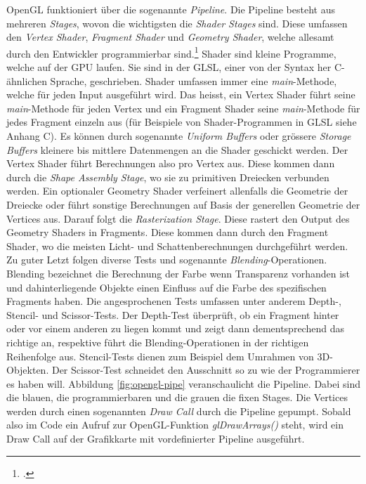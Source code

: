 \documentclass[titlepage, 11pt, a4paper, ngerman]{article}
\begin{document}
\acrshort{OpenGL} funktioniert über die sogenannte \textit{Pipeline}. Die Pipeline besteht aus mehreren \textit{Stages}, wovon die wichtigsten die \textit{\gls{Shader} Stages} sind. Diese umfassen den \textit{\gls{Vertex} \gls{Shader}}, \textit{\gls{Fragment} \gls{Shader}} und \textit{Geometry \gls{Shader}}, welche allesamt durch den Entwickler programmierbar sind.\footcite{ogl-pipeline-khronos-wiki} \gls{Shader} sind kleine Programme, welche auf der GPU laufen. Sie sind in der \acrfull{GLSL}, einer von der Syntax her C-ähnlichen Sprache, geschrieben. \gls{Shader} umfassen immer eine \textit{main}-Methode, welche für jeden Input ausgeführt wird. Das heisst, ein \gls{Vertex} \gls{Shader} führt seine \textit{main}-Methode für jeden \gls{Vertex} und ein \gls{Fragment} \gls{Shader} seine \textit{main}-Methode für jedes \gls{Fragment} einzeln aus (für Beispiele von \gls{Shader}-Programmen in \acrshort{GLSL} siehe Anhang C). Es können durch sogenannte \textit{Uniform Buffers} oder grössere \textit{Storage Buffers} kleinere bis mittlere Datenmengen an die \gls{Shader} geschickt werden. Der \gls{Vertex} \gls{Shader} führt Berechnungen also pro \gls{Vertex} aus. Diese kommen dann durch die \textit{Shape Assembly Stage}, wo sie zu primitiven Dreiecken verbunden werden. Ein optionaler Geometry \gls{Shader} verfeinert allenfalls die Geometrie der Dreiecke oder führt sonstige Berechnungen auf Basis der generellen Geometrie der \gls{Vertices} aus. Darauf folgt die \textit{Rasterization Stage}. Diese rastert den Output des Geometry \gls{Shader}s in \glspl{Fragment}. Diese kommen dann durch den \gls{Fragment} \gls{Shader}, wo die meisten Licht- und Schattenberechnungen durchgeführt werden. Zu guter Letzt folgen diverse Tests und sogenannte \textit{Blending}-Operationen. Blending bezeichnet die Berechnung der Farbe wenn Transparenz vorhanden ist und dahinterliegende Objekte einen Einfluss auf die Farbe des spezifischen \gls{Fragment}s haben. Die angesprochenen Tests umfassen unter anderem Depth-, Stencil- und Scissor-Tests. Der Depth-Test überprüft, ob ein \gls{Fragment} hinter oder vor einem anderen zu liegen kommt und zeigt dann dementsprechend das richtige an, respektive führt die Blending-Operationen in der richtigen Reihenfolge aus. Stencil-Tests dienen zum Beispiel dem Umrahmen von 3D-Objekten. Der Scissor-Test schneidet den Ausschnitt so zu wie der Programmierer es haben will. Abbildung \ref{fig:opengl-pipe} veranschaulicht die Pipeline. Dabei sind die blauen, die programmierbaren und die grauen die fixen Stages. Die \gls{Vertices} werden durch einen sogenannten \textit{Draw Call} durch die Pipeline gepumpt. Sobald also im Code ein Aufruf zur \acrshort{OpenGL}-Funktion \textit{glDrawArrays()} steht, wird ein Draw Call auf der Grafikkarte mit vordefinierter Pipeline ausgeführt.
\end{document}
